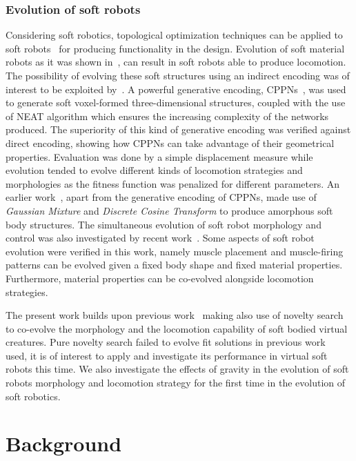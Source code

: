 \documentclass{sig-alternate}
\begin{document}
\subsubsection*{Evolution of soft robots}

Considering soft robotics, topological optimization techniques can be applied to soft robots~\cite{hiller2009multi} for producing functionality in the design. Evolution of soft material robots as it was shown in~\cite{hiller2012automatic}, can result in soft robots able to produce locomotion. The possibility of evolving these soft structures using an indirect encoding was of interest to be exploited by~\cite{cheney2013unshackling}. A powerful generative encoding, CPPNs~\cite{stanley2007compositional}, was used to generate soft voxel-formed three-dimensional structures, coupled with the use of NEAT algorithm which ensures the increasing complexity of the networks produced. The superiority of this kind of generative encoding was verified against direct encoding, showing how CPPNs can take advantage of their geometrical properties. Evaluation was done by a simple displacement measure while evolution tended to evolve different kinds of locomotion strategies and morphologies as the fitness function was penalized for different parameters. An earlier work~\cite{hiller2010evolving}, apart from the generative encoding of CPPNs, made use of \textit{Gaussian Mixture} and \textit{Discrete Cosine Transform} to produce amorphous soft body structures. The simultaneous evolution of soft robot morphology and control was also investigated by recent work~\cite{rieffel2014growing}. Some aspects of soft robot evolution were verified in this work, namely muscle placement and muscle-firing patterns can be evolved given a fixed body shape and fixed material properties. Furthermore, material properties can be co-evolved alongside locomotion strategies.

The present work builds upon previous work~\cite{cheney2013unshackling} making also use of novelty search to co-evolve the morphology and the locomotion capability of soft bodied virtual creatures. Pure novelty search failed to evolve fit solutions in previous work~\cite{lehman2011evolving} used, it is of interest to apply and investigate its performance in virtual soft robots this time. We also investigate the effects of gravity in the evolution of soft robots morphology and locomotion strategy for the first time in the evolution of soft robotics. 

\section{Background}
\end{document}
